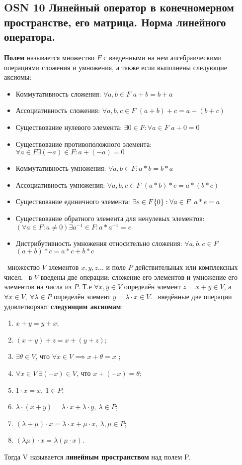 \subsection{OSN 10 Линейный оператор в конечномерном пространстве, его матрица. Норма линейного оператора.}


\textbf{Полем} называется множество $F$ с введенными на нем алгебраическими операциями сложения и умножения, а также если выполнены следующие аксиомы:
\begin{itemize}
    \item Коммутативность сложения: $\forall a,b \in F$ $a + b = b + a$
    \item Ассоциативность сложения: $\forall a,b,c \in F$ $(a + b) + c = a + (b + c)$
    \item Существование нулевого элемента: $\exists 0 \in F: \forall a \in F$ $a + 0 = 0$
    \item Существование противоположного элемента: $\forall a \in F \exists (-a) \in F: a + (-a) = 0$
    \item Коммутативность умножения: $\forall a, b \in F: a * b = b * a$
    \item Ассоциативность умножения: $\forall a,b,c \in F$ $(a * b) * c = a * (b * c)$
    \item Существование единичного элемента: $\exists e \in F\\ \{0\}: \forall a \in F$ $a * e = a$ 
    \item Существование обратного элемента для ненулевых элементов: $ (\forall a \in F: a \neq 0) \exists a^{-1} \in F: a * a^{-1} = e$
    \item Дистрибутивность умножения относительно сложения: $\forall a,b,c \in F$ $(a + b) *c = a * c + b * c$
\end{itemize}


\faEye \ множество $V$ элементов $x, y, z\dots$ и поле $P$ действительных или комплексных чисел. \mathLet \ в $V$ введены две операции: сложение его элементов и умножение его элементов на числа из $P$. 
Т.е $\forall x,y \in V$ определён элемент $z = x+y \in V$, а $\forall x \in V, ~ \forall \lambda \in P$ определён элемент $y = \lambda \cdot x \in  V$. \mathLet \ введённые две операции удовлетворяют \textbf{следующим аксиомам}:
\begin{enumerate}
    \item $x+y=y+x$;
    \item $(x+y)+z=x+(y+z)$;
    \item $\exists \theta\in V$, что $\forall x\in V \implies x+\theta=x$ ;
    \item $\forall x \in V ~ \exists (-x) \in V$, что $x + (-x) = \theta$;
    \item $1 \cdot x = x,~1 \in P$;
    \item $\lambda \cdot(x+y)=\lambda \cdot x+\lambda \cdot y,~\lambda \in P$;
    \item $(\lambda +\mu)\cdot x=\lambda \cdot x+\mu \cdot x,~\lambda,\mu \in P$;
    \item $(\lambda \mu )\cdot x = \lambda (\mu \cdot x)$.
\end{enumerate}
Тогда V называется \textbf{линейным пространством} над полем P.

